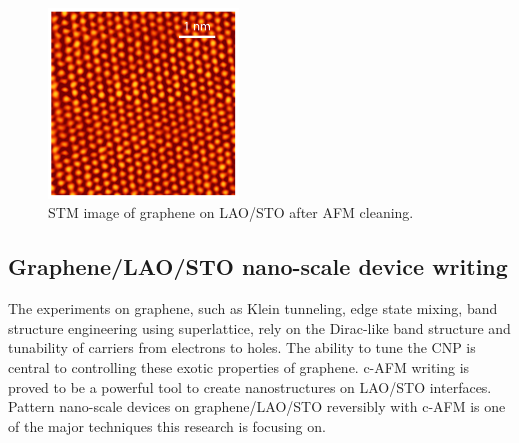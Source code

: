 \documentclass[pdflatex, sectionletters, 12pt]{pittetd}    %
\begin{document}
\begin{figure}[h!]
	\centering
	\includegraphics[width=0.45\textwidth]{Drawing/GrapheneSTM.pdf}
	\caption{STM image of graphene on LAO/STO after AFM cleaning.}
	\label{FIG:GrapheneSTM}
\end{figure}

\subsection{Graphene/LAO/STO nano-scale device writing}

The experiments on graphene, such as Klein tunneling\cite{allain2011klein, katsnelson2006chiral, young2009quantum, shytov2008klein}, edge state mixing\cite{williams2007quantum, abanin2007quantized, lohmann2009four, amet2014selective}, band structure engineering using superlattice\cite{forsythe2018band}, rely on the Dirac-like band structure and tunability of carriers from electrons to holes. The ability to tune the CNP is central to controlling these exotic properties of graphene. c-AFM writing is proved to be a powerful tool to create nanostructures on LAO/STO interfaces. Pattern nano-scale devices on graphene/LAO/STO reversibly with c-AFM is one of the major techniques this research is focusing on. 
\end{document}
